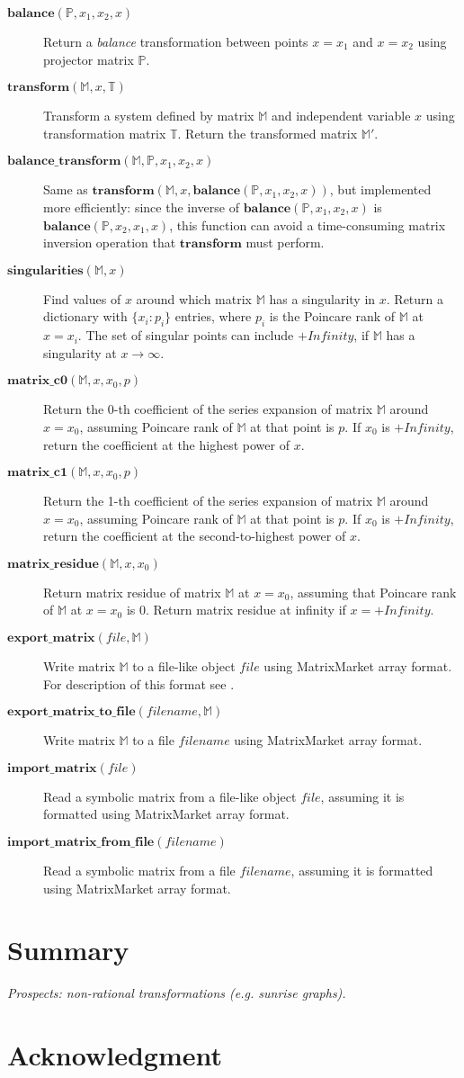 \documentclass[12pt,a4paper]{article}
\def\F#1{\mathbf{#1}} %
\def\M#1{\mathbb{#1}} %
\def\functionitem#1#2{\item[$\F{#1}(#2)$]}
\begin{document}
\begin{description}
\functionitem{balance}{\M P, x_1, x_2, x}
Return a \textit{balance} transformation between points $x=x_1$
and $x=x_2$ using projector matrix $\M P$.

\functionitem{transform}{\M M, x, \M T}
Transform a system defined by matrix $\M M$ and independent
variable $x$ using transformation matrix $\M T$. Return the
transformed matrix $\M M'$.

\functionitem{balance\_transform}{\M M, \M P, x_1, x_2, x}
Same as $\F{transform}(\M M, x, \F{balance}(\M P, x_1, x_2, x))$,
but implemented more efficiently: since the inverse of
$\F{balance}(\M P, x_1, x_2, x)$ is $\F{balance}(\M P, x_2, x_1, x)$,
this function can avoid a time-consuming matrix inversion
operation that $\F{transform}$ must perform.

\functionitem{singularities}{\M M, x}
Find values of $x$ around which matrix $\M M$ has a singularity in
$x$. Return a dictionary with $\{x_i: p_i\}$ entries, where $p_i$
is the Poincare rank of $\M M$ at $x=x_i$. The set of singular points
can include $+Infinity$, if $\M M$ has a singularity at $x\to\infty$.

\functionitem{matrix\_c0}{\M M, x, x_0, p}
Return the 0-th coefficient of the series expansion of matrix
$\M M$ around $x=x_0$, assuming Poincare rank of $\M M$ at that
point is $p$. If $x_0$ is $+Infinity$, return the coefficient
at the highest power of $x$.

\functionitem{matrix\_c1}{\M M, x, x_0, p}
Return the 1-th coefficient of the series expansion of matrix
$\M M$ around $x=x_0$, assuming Poincare rank of $\M M$ at that
point is $p$. If $x_0$ is $+Infinity$, return the coefficient
at the second-to-highest power of $x$.

\functionitem{matrix\_residue}{\M M, x, x_0}
Return matrix residue of matrix $\M M$ at $x=x_0$, assuming that
Poincare rank of $\M M$ at $x=x_0$ is $0$. Return matrix residue
at infinity if $x=+Infinity$.

\functionitem{export\_matrix}{file, \M M}
Write matrix $\M M$ to a file-like object $file$ using MatrixMarket
array format. For description of this format see \cite{BPR96}.

\functionitem{export\_matrix\_to\_file}{filename, \M M}
Write matrix $\M M$ to a file $filename$ using MatrixMarket
array format.

\functionitem{import\_matrix}{file}
Read a symbolic matrix from a file-like object $file$, assuming
it is formatted using MatrixMarket array format.

\functionitem{import\_matrix\_from\_file}{filename}
Read a symbolic matrix from a file $filename$, assuming it is
formatted using MatrixMarket array format.

\end{description}

\section{Summary}
\label{sec:4}

{\it Prospects: non-rational transformations (e.g. sunrise graphs). }

\section*{Acknowledgment}


\end{document}
